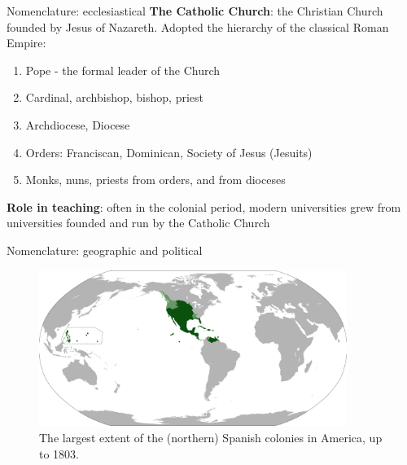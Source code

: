 \documentclass{beamer}
\begin{document}
\begin{frame}{Nomenclature: ecclesiastical}
\textbf{The Catholic Church}: the Christian Church founded by Jesus of Nazareth.  Adopted the hierarchy of the classical Roman Empire:
\begin{enumerate}
\item Pope - the formal leader of the Church
\item Cardinal, archbishop, bishop, priest
\item Archdiocese, Diocese
\item Orders: Franciscan, Dominican, Society of Jesus (Jesuits)
\item Monks, nuns, priests from orders, and from dioceses
\end{enumerate}
\textbf{Role in teaching}: often in the colonial period, modern universities grew from universities founded and run by the Catholic Church
\end{frame}

\begin{frame}{Nomenclature: geographic and political}
\begin{figure}
\centering
\includegraphics[width=10cm]{figures/vice.png}
\caption{The largest extent of the (northern) Spanish colonies in America, up to 1803.}
\end{figure}
\end{frame}
\end{document}
